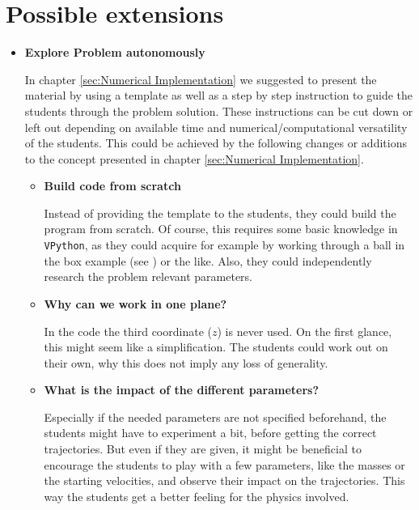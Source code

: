 \documentclass[12pt,ngerman,american]{iopart}
\begin{document}
\section{Possible extensions}\label{sec:extensions}

\begin{itemize}

\item \textbf{Explore Problem autonomously}

In chapter \ref{sec:Numerical Implementation} we suggested to present the material by using a template as well as a step by step instruction to guide the students through the problem solution.
These instructions can be cut down or left out depending on available time and numerical/computational versatility of the students.
This could be achieved by the following changes or additions to the concept presented in chapter \ref{sec:Numerical Implementation}.

\begin{itemize}
\item \textbf{Build code from scratch}

Instead of providing the template to the students, they could build the program from scratch.
Of course, this requires some basic knowledge in \texttt{VPython}, as they could acquire for example by working through a ball in the box example (see \cite{VPythonIntro}) or the like.
Also, they could independently research the problem relevant parameters.
\item \textbf{Why can we work in one plane?}

In the code the third coordinate ($z$) is never used.
On the first glance, this might seem like a simplification.
The students could work out on their own, why this does not imply any loss of generality.
\item \textbf{What is the impact of the different parameters?}

Especially if the needed parameters are not specified beforehand, the students might have to experiment a bit, before getting the correct trajectories.
But even if they are given, it might be beneficial to encourage the students to play with a few parameters, like the masses or the starting velocities, and observe their impact on the trajectories.
This way the students get a better feeling for the physics involved.
\end{itemize}


\end{itemize}
\end{document}
